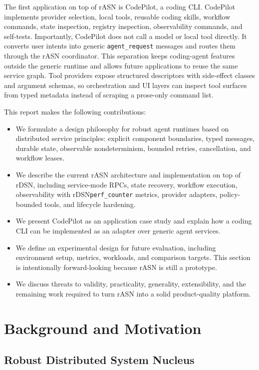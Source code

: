 \documentclass[manuscript,screen,review]{acmart}
\newcommand{\rasn}{rASN\xspace}
\newcommand{\rdsn}{rDSN\xspace}
\newcommand{\codepilot}{CodePilot\xspace}
\begin{document}
The first application on top of \rasn is \codepilot, a coding CLI. \codepilot
implements provider selection, local tools, reusable coding skills, workflow
commands, state inspection, registry inspection, observability commands, and
self-tests. Importantly, \codepilot does not call a model or local tool
directly. It converts user intents into generic \texttt{agent\_request}
messages and routes them through the \rasn coordinator. This separation keeps
coding-agent features outside the generic runtime and allows future
applications to reuse the same service graph. Tool providers expose structured
descriptors with side-effect classes and argument schemas, so orchestration and
UI layers can inspect tool surfaces from typed metadata instead of scraping a
prose-only command list.

This report makes the following contributions:

\begin{itemize}
  \item We formulate a design philosophy for robust agent runtimes based on
  distributed service principles: explicit component boundaries, typed
  messages, durable state, observable nondeterminism, bounded retries,
  cancellation, and workflow leases.
  \item We describe the current \rasn architecture and implementation on top of
  \rdsn, including service-mode RPCs, state recovery, workflow execution,
  observability with \rdsn \texttt{perf\_counter} metrics, provider adapters,
  policy-bounded tools, and lifecycle hardening.
  \item We present \codepilot as an application case study and explain how a
  coding CLI can be implemented as an adapter over generic agent services.
  \item We define an experimental design for future evaluation, including
  environment setup, metrics, workloads, and comparison targets. This section is
  intentionally forward-looking because \rasn is still a prototype.
  \item We discuss threats to validity, practicality, generality,
  extensibility, and the remaining work required to turn \rasn into a solid
  product-quality platform.
\end{itemize}

\section{Background and Motivation}

\subsection{Robust Distributed System Nucleus}
\end{document}
